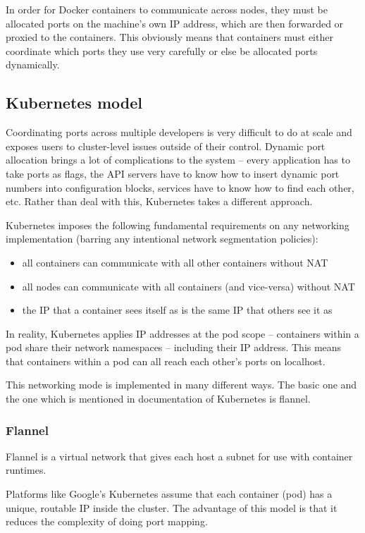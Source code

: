 In order for Docker containers to communicate across nodes, they must be allocated ports on the machine’s own IP address, which are then forwarded or proxied to the containers. This obviously means that containers must either coordinate which ports they use very carefully or else be allocated ports dynamically. \cite{kubernetes-networking}

\subsection{Kubernetes model} 
Coordinating ports across multiple developers is very difficult to do at scale and exposes users to cluster-level issues outside of their control. Dynamic port allocation brings a lot of complications to the system – every application has to take ports as flags, the API servers have to know how to insert dynamic port numbers into configuration blocks, services have to know how to find each other, etc. Rather than deal with this, Kubernetes takes a different approach.

Kubernetes imposes the following fundamental requirements on any networking implementation (barring any intentional network segmentation policies):

\begin{itemize}
\item	all containers can communicate with all other containers without NAT
\item	all nodes can communicate with all containers (and vice-versa) without NAT
\item	the IP that a container sees itself as is the same IP that others see it as
\end{itemize}

In reality, Kubernetes applies IP addresses at the pod scope -- containers within a pod share their network namespaces -- including their IP address. This means that containers within a pod can all reach each other’s ports on localhost.

This networking mode is implemented in many different ways. The basic one and the one which is mentioned in documentation of Kubernetes is flannel. \cite{kubernetes-networking}

\subsubsection{Flannel}
Flannel is a virtual network that gives each host a subnet for use with container runtimes.

Platforms like Google's Kubernetes assume that each container (pod) has a unique, routable IP inside the cluster. The advantage of this model is that it reduces the complexity of doing port mapping.

